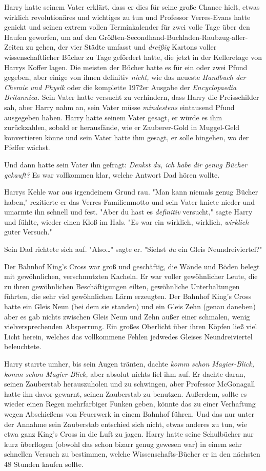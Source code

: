 {Harry hatte seinem Vater erklärt, dass er dies für seine große Chance hielt, etwas wirklich revolutionäres und wichtiges zu tun und Professor Verres-Evans hatte genickt und seinen extrem vollen Terminkalender für zwei volle Tage über den Haufen geworfen, um auf den Größten-Secondhand-Buchladen-Raubzug-aller-Zeiten zu gehen, der vier Städte umfasst und \emph{dreißig} Kartons voller wissenschaftlicher Bücher zu Tage gefördert hatte, die jetzt in der Kelleretage von Harrys Koffer lagen. Die meisten der Bücher hatte es für ein oder zwei Pfund gegeben, aber einige von ihnen definitiv \emph{nicht,} wie das neueste \emph{Handbuch der Chemie und Physik} oder die komplette 1972er Ausgabe der \emph{Encyclopaedia Britannica.} Sein Vater hatte versucht zu verhindern, dass Harry die Preisschilder sah, aber Harry nahm an, sein Vater müsse \emph{mindestens} eintausend Pfund ausgegeben haben. Harry hatte seinem Vater gesagt, er würde es ihm zurückzahlen, sobald er herausfände, wie er Zauberer-Gold in Muggel-Geld konvertieren könne und sein Vater hatte ihm gesagt, er solle hingehen, wo der Pfeffer wächst.

Und dann hatte sein Vater ihn gefragt: \emph{Denkst du, ich habe dir genug Bücher gekauft?} Es war vollkommen klar, welche Antwort Dad hören wollte.

Harrys Kehle war aus irgendeinem Grund rau. "Man kann niemals genug Bücher haben," rezitierte er das Verres-Familienmotto und sein Vater kniete nieder und umarmte ihn schnell und fest. "Aber du hast es \emph{definitiv} versucht," sagte Harry und fühlte, wieder einen Kloß im Hals. "Es war ein wirklich, wirklich, \emph{wirklich} guter Versuch."

Sein Dad richtete sich auf. "Also…" sagte er. "Siehst \emph{du} ein Gleis Neundreiviertel?"

Der Bahnhof King's Cross war groß und geschäftig, die Wände und Böden belegt mit gewöhnlichen, verschmutzten Kacheln. Er war voller gewöhnlicher Leute, die zu ihren gewöhnlichen Beschäftigungen eilten, gewöhnliche Unterhaltungen führten, die sehr viel gewöhnlichen Lärm erzeugten. Der Bahnhof King's Cross hatte ein Gleis Neun (bei dem sie standen) und ein Gleis Zehn (genau daneben) aber es gab nichts zwischen Gleis Neun und Zehn außer einer schmalen, wenig vielversprechenden Absperrung. Ein großes Oberlicht über ihren Köpfen ließ viel Licht herein, welches das vollkommene Fehlen jedwedes Gleises Neundreiviertel beleuchtete.

Harry starrte umher, bis sein Augen tränten, dachte \emph{komm schon Magier-Blick, komm schon Magier-Blick,} aber absolut nichts fiel ihm auf. Er dachte daran, seinen Zauberstab herauszuholen und zu schwingen, aber Professor McGonagall hatte ihn davor gewarnt, seinen Zauberstab zu benutzen. Außerdem, sollte es wieder einen Regen mehrfarbiger Funken geben, könnte das zu einer Verhaftung wegen Abschießens von Feuerwerk in einem Bahnhof führen. Und das nur unter der Annahme sein Zauberstab entschied sich nicht, etwas anderes zu tun, wie etwa ganz King's Cross in die Luft zu jagen. Harry hatte seine Schulbücher nur kurz überflogen (obwohl das schon bizarr genug gewesen war) in einem sehr schnellen Versuch zu bestimmen, welche Wissenschafts-Bücher er in den nächsten 48 Stunden kaufen sollte.

}
